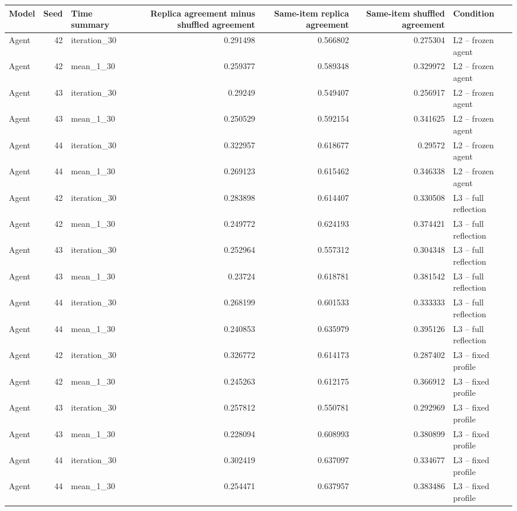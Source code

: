 \begin{table}[htbp!]
\centering
\small
\setlength{\tabcolsep}{3pt}
\renewcommand{\arraystretch}{1.1}
\begin{tabular}{lrlrrrl}
\hline
Model & Seed & Time summary & Replica agreement minus shuffled agreement & Same-item replica agreement & Same-item shuffled agreement & Condition \\
\hline
Agent & 42 & iteration\_30 & 0.291498 & 0.566802 & 0.275304 & L2 -- frozen agent \\
Agent & 42 & mean\_1\_30 & 0.259377 & 0.589348 & 0.329972 & L2 -- frozen agent \\
Agent & 43 & iteration\_30 & 0.29249 & 0.549407 & 0.256917 & L2 -- frozen agent \\
Agent & 43 & mean\_1\_30 & 0.250529 & 0.592154 & 0.341625 & L2 -- frozen agent \\
Agent & 44 & iteration\_30 & 0.322957 & 0.618677 & 0.29572 & L2 -- frozen agent \\
Agent & 44 & mean\_1\_30 & 0.269123 & 0.615462 & 0.346338 & L2 -- frozen agent \\
Agent & 42 & iteration\_30 & 0.283898 & 0.614407 & 0.330508 & L3 -- full reflection \\
Agent & 42 & mean\_1\_30 & 0.249772 & 0.624193 & 0.374421 & L3 -- full reflection \\
Agent & 43 & iteration\_30 & 0.252964 & 0.557312 & 0.304348 & L3 -- full reflection \\
Agent & 43 & mean\_1\_30 & 0.23724 & 0.618781 & 0.381542 & L3 -- full reflection \\
Agent & 44 & iteration\_30 & 0.268199 & 0.601533 & 0.333333 & L3 -- full reflection \\
Agent & 44 & mean\_1\_30 & 0.240853 & 0.635979 & 0.395126 & L3 -- full reflection \\
Agent & 42 & iteration\_30 & 0.326772 & 0.614173 & 0.287402 & L3 -- fixed profile \\
Agent & 42 & mean\_1\_30 & 0.245263 & 0.612175 & 0.366912 & L3 -- fixed profile \\
Agent & 43 & iteration\_30 & 0.257812 & 0.550781 & 0.292969 & L3 -- fixed profile \\
Agent & 43 & mean\_1\_30 & 0.228094 & 0.608993 & 0.380899 & L3 -- fixed profile \\
Agent & 44 & iteration\_30 & 0.302419 & 0.637097 & 0.334677 & L3 -- fixed profile \\
Agent & 44 & mean\_1\_30 & 0.254471 & 0.637957 & 0.383486 & L3 -- fixed profile \\

\end{tabular}
\end{table}
